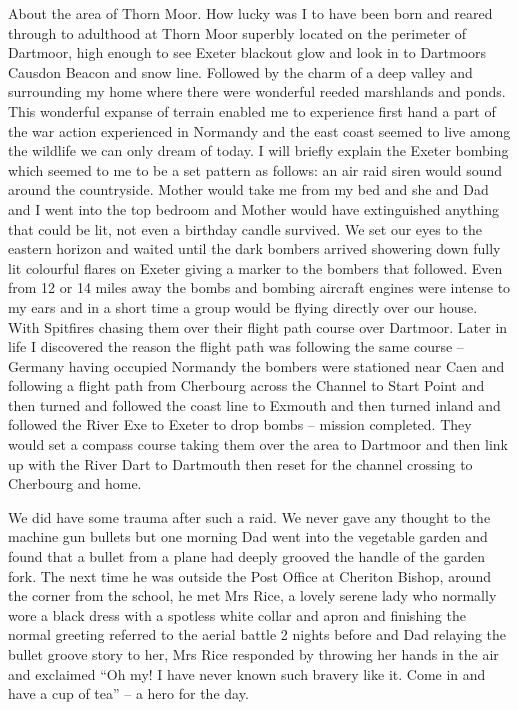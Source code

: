 About the area of Thorn Moor.  How lucky was I to have been born and reared
through to adulthood at Thorn Moor superbly located on the perimeter of
Dartmoor, high enough to see Exeter blackout glow and look in to Dartmoors
Causdon Beacon and snow line.  Followed by the charm of a deep valley and
surrounding my home where there were wonderful reeded marshlands and ponds.
This wonderful expanse of terrain enabled me to experience first hand a part of
the war action experienced in Normandy and the east coast seemed to live among
the wildlife we can only dream of today. I will briefly explain the Exeter
bombing which seemed to me to be a set pattern as follows:  an air raid siren
would sound around the countryside.  Mother would take me from my bed and she
and Dad and I went into the top bedroom and Mother would have extinguished
anything that could be lit, not even a birthday candle survived.  We set our
eyes to the eastern horizon and waited until the dark bombers arrived showering
down fully lit colourful flares on Exeter giving a marker to the bombers that
followed.  Even from 12 or 14 miles away the bombs and bombing aircraft engines
were intense to my ears and in a short time a group would be flying directly
over our house.  With Spitfires chasing them over their flight path course over
Dartmoor.  Later in life I discovered the reason the flight path was following
the same course – Germany having occupied Normandy the bombers were stationed
near Caen and following a flight path from Cherbourg across the Channel to
Start Point and then turned and followed the coast line to Exmouth and then
turned inland and followed the River Exe to Exeter to drop bombs – mission
completed.  They would set a compass course taking them over the area to
Dartmoor and then link up with the River Dart to Dartmouth then reset for the
channel crossing to Cherbourg and home.

We did have some trauma after such a raid.  We never gave any thought to the
machine gun bullets but one morning Dad went into the vegetable garden and
found that a bullet from a plane had deeply grooved the handle of the garden
fork.  The next time he was outside the Post Office at Cheriton Bishop, around
the corner from the school, he met Mrs Rice, a lovely serene lady who normally
wore a black dress with a spotless white collar and apron and finishing the
normal greeting referred to the aerial battle 2 nights before and Dad relaying
the bullet groove story to her, Mrs Rice responded by throwing her hands in the
air and exclaimed ``Oh my!  I have never known such bravery like it.  Come in
and have a cup of tea'' – a hero for the day.

